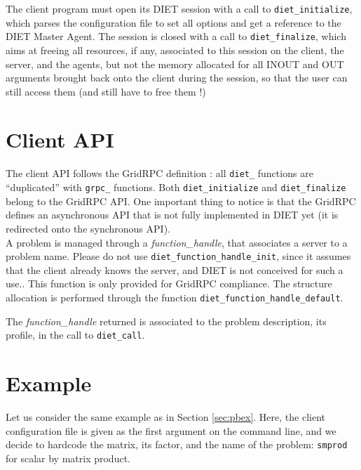 The client program must open its DIET session with a call to
\texttt{diet\_initialize}, which parses the configuration file to set all
options and get a reference to the DIET Master Agent. The session is closed with
a call to \texttt{diet\_finalize}, which aims at freeing all resources, if any,
associated to this session on the client, the server, and the agents, but not
the memory allocated for all INOUT and OUT arguments brought back onto the
client during the session, so that the user can still access them (and still
have to free them !)


\section{Client API}
\label{sec:clAPI}

The client API follows the GridRPC definition \cite{gridRPC:02}: all
\texttt{diet\_} functions are ``duplicated'' with \texttt{grpc\_} functions.
Both \texttt{diet\_initialize} and \texttt{diet\_finalize} belong to the GridRPC
API.  One important thing to notice is that the GridRPC defines an asynchronous
API that is not fully implemented in DIET yet (it is redirected onto the
synchronous
API).\\

A problem is managed through a \emph{function\_handle}, that associates a server
to a problem name. Please do not use \texttt{diet\_function\_handle\_init},
since it assumes that the client already knows the server, and DIET is not
conceived for such a use.. This function is only provided for GridRPC
compliance. The structure allocation is performed through the function
\texttt{diet\_function\_handle\_default}.

The \emph{function\_handle} returned is associated to the problem description,
its profile, in the call to \texttt{diet\_call}.

\section{Example}
\label{sec:cl_ex}

Let us consider the same example as in Section \ref{sec:pbex}.  Here, the client
configuration file is given as the first argument on the command line, and we
decide to hardcode the matrix, its factor, and the name of the problem:
\texttt{smprod} for scalar by matrix product.


